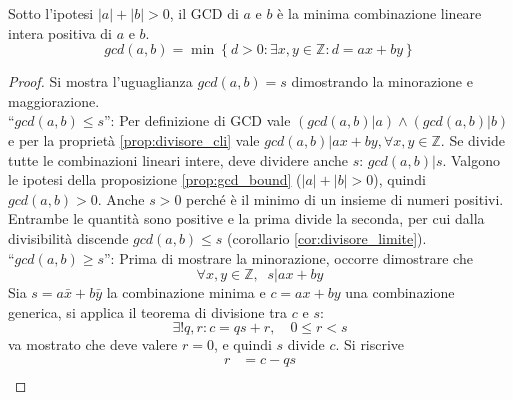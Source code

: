 \begin{theorem} 
    \label{teo:bezout}
    Sotto l'ipotesi $|a| + |b| > 0$, il GCD
    di $a$ e $b$
    è la minima combinazione lineare intera positiva 
    di $a$ e $b$.
    \begin{equation*}
        gcd(a,b) =
        \min \left\{ 
            d > 0 :
            \exists x, y \in \mathbb{Z} :
            d = ax + by
        \right\}
    \end{equation*}
    \begin{proof}
        Si mostra l'uguaglianza $
        gcd(a,b) = s
        $ dimostrando la minorazione e maggiorazione.
        \\
        ``$ gcd(a,b) \leq s $'':
        Per definizione di GCD vale $
        \left( 
            gcd(a,b) | a
        \right)
        \wedge
        \left( 
            gcd(a,b) | b
        \right)
        $
        e per la proprietà \ref{prop:divisore_cli} vale $
        gcd(a,b) 
        | ax + by
        ,
        \forall x, y \in \mathbb{Z}
        $.
        Se divide tutte le combinazioni lineari intere, deve dividere anche $s$:
        $
        gcd(a,b) | s
        $.
        Valgono le ipotesi della proposizione \ref{prop:gcd_bound} ($|a| + |b| > 0$), quindi $
        gcd(a,b) > 0
        $.
        Anche $s>0$ perché è il minimo di un insieme di numeri positivi.
        Entrambe le quantità sono positive e la prima divide la seconda, per cui dalla divisibilità discende $
        gcd(a,b) \leq s
        $ (corollario \ref{cor:divisore_limite}).
        \\
        ``$ gcd(a,b) \geq s $'':
        Prima di mostrare la minorazione, occorre dimostrare che
        \begin{equation*}
            \forall x, y \in \mathbb{Z}
            ,
            \;\;
            s | ax + by
        \end{equation*}
        Sia $
        s = a \bar{x} + b \bar{y}
        $ la combinazione minima e $
        c = ax + by
        $ una combinazione generica, si applica il teorema di divisione tra $c$ e $s$:
        \begin{equation*}
            \exists ! q, r :
            c = qs + r
            ,
            \quad
            0 \leq r < s
        \end{equation*}
        va mostrato che deve valere $r=0$, e quindi $s$ divide $c$.
        Si riscrive
        \begin{align*}
            r &= 
            c - qs
            \\

\end{align*}
\end{proof}
\end{theorem}
